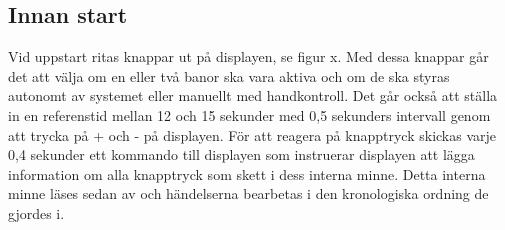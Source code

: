 \subsection{Innan start}

Vid uppstart ritas knappar ut på displayen, se figur x. Med dessa knappar går
det att välja om en eller två banor ska vara aktiva och om de ska styras
autonomt av systemet eller manuellt med handkontroll. Det går också att ställa
in en referenstid mellan 12 och 15 sekunder med 0,5 sekunders intervall genom
att trycka på + och - på displayen. För att reagera på knapptryck skickas varje
0,4 sekunder ett kommando till displayen som instruerar displayen att lägga
information om alla knapptryck som skett i dess interna minne. Detta interna
minne läses sedan av och händelserna bearbetas i den kronologiska ordning de
gjordes i.
